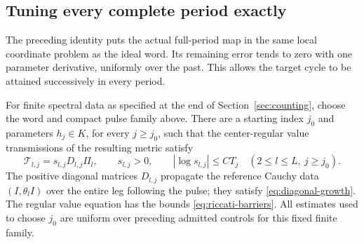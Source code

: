 \subsection{Tuning every complete period exactly}
\label{subsec:tuning}

The preceding identity puts the actual full-period map in the
same local coordinate problem as the ideal word.  Its remaining
error tends to zero with one parameter derivative, uniformly
over the past.  This allows the target cycle to be attained
successively in every period.

\begin{proposition}
\label{prop:transmission}
For finite spectral data as specified at the end of Section~\ref{sec:counting},
choose the word and compact pulse family above. There are a starting
index \(j_0\) and parameters \(h_j\in K\), for every \(j\geq j_0\),
such that the center-regular value transmissions of the resulting metric
satisfy
\begin{equation}
 \mathcal T_{l,j}=s_{l,j}D_{l,j}\Pi_l,\qquad
 s_{l,j}>0,\qquad |\log s_{l,j}|\leq C T_j
 \quad(2\leq l\leq L,\ j\geq j_0).
 \label{eq:exact-transmission}
\end{equation}
The positive diagonal matrices \(D_{l,j}\) propagate the reference
Cauchy data \((I,\theta_l I)\) over the entire leg following the pulse;
they satisfy \eqref{eq:diagonal-growth}. The regular value equation has the
bounds \eqref{eq:riccati-barriers}. All estimates used to choose \(j_0\)
are uniform over preceding admitted controls for this fixed finite family.
\end{proposition}

